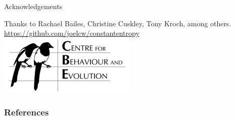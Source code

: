 \documentclass[hyperref={pdfpagelabels=false}]{beamer}
\begin{document}
\begin{frame}{Acknowledgements}
\begin{center}

Thanks to Rachael Bailes, Christine Cuskley, Tony Kroch, among others.
\url{https://github.com/joelcw/constantentropy}\\\vspace{3mm}
\includegraphics[scale = 0.4]{CBElogo.jpg} 
\end{center}
\end{frame}


\begin{frame}[allowframebreaks]
\frametitle{References}
\newcommand*{\newblock}{natbib}


\end{frame}
\end{document}
